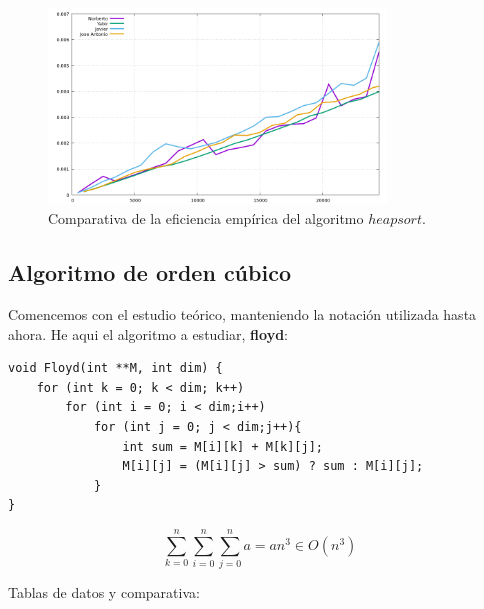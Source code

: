 \documentclass[11pt,a4paper]{article}
\begin{document}
\begin{figure}[H]
	\centering
	\includegraphics[width=0.8\textwidth]{../plots/heapsort}
	\caption{Comparativa de la eficiencia empírica del algoritmo $heapsort$.}
\end{figure}

\subsection{Algoritmo de orden cúbico}

Comencemos con el estudio teórico, manteniendo la notación utilizada hasta ahora. He aqui el algoritmo a estudiar, \textbf{floyd}:

\begin{lstlisting}
void Floyd(int **M, int dim) {
	for (int k = 0; k < dim; k++)
		for (int i = 0; i < dim;i++)
			for (int j = 0; j < dim;j++){
				int sum = M[i][k] + M[k][j];
				M[i][j] = (M[i][j] > sum) ? sum : M[i][j];
			}
}
\end{lstlisting}

$$\sum_{k=0}^{n} \sum_{i=0}^{n} \sum_{j=0}^{n} a = a n^3 \in O(n^3)$$

Tablas de datos y comparativa:
\end{document}
